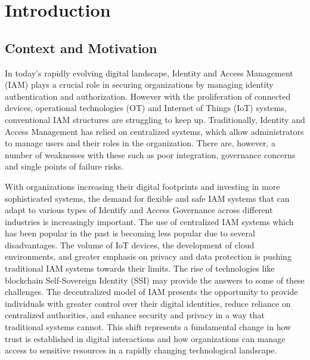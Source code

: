 
%

\chapter{Introduction}
\label{cha:introduction}





\section{Context and Motivation}
\label{sec:context_and_motivation}

In today’s rapidly evolving digital landscape, Identity and Access Management (IAM)  plays a crucial role in securing organizations by managing identity authentication and authorization. However with the proliferation of connected devices, operational technologies (OT) and Internet of Things (IoT) systems, conventional IAM structures are struggling to keep up. Traditionally, Identity and Access Management has relied on centralized systems, which allow administrators to manage users and their roles in the organization. There are, however, a number of weaknesses with these such as poor integration, governance concerns and single points of failure risks.

With organizations increasing their digital footprints and investing in more sophisticated systems, the demand for flexible and safe IAM systems that can adapt to various types of Identify and Access Governance across different industries is increasingly important. The use of centralized IAM systems which has been popular in the past is becoming less popular due to several disadvantages. The volume of IoT devices, the development of cloud environments, and greater emphasis on privacy and data protection is pushing traditional IAM systems towards their limits. The rise of technologies like blockchain Self-Sovereign Identity (SSI) may provide the answers to some of these challenges. The decentralized model of IAM presents the opportunity to provide individuals with greater control over their digital identities, reduce reliance on centralized authorities, and enhance security and privacy in a way that traditional systems cannot. This shift represents a fundamental change in how trust is established in digital interactions and how organizations can manage access to sensitive resources in a rapidly changing technological landscape.

